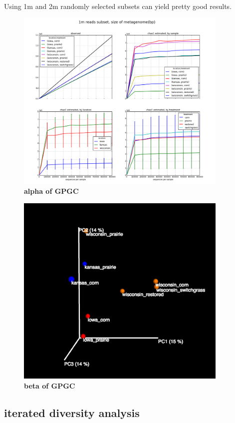 \documentclass{article}
\begin{document}


Using 1m and 2m randomly selected subsets can yield pretty good results.



\begin{figure}[!ht]
 \centerline{\includegraphics[width=4in]{./figures/GPGC_1m_old.png}}
\caption{\bf alpha of GPGC}
\label{fig:concept}
\end{figure}



\begin{figure}[!ht]
 \centerline{\includegraphics[width=4in]{./figures/GPGC_old_subset1M.png}}
\caption{\bf beta of GPGC}
\label{fig:concept}
\end{figure}

\subsection{iterated diversity analysis}
\end{document}
